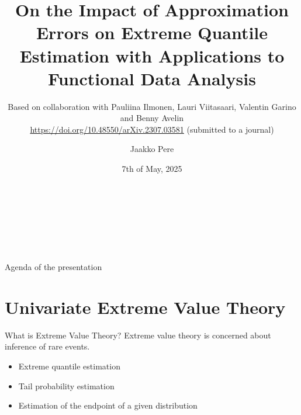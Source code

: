 \documentclass[11pt, aspectratio=169]{beamer}
\author[Jaakko Pere]{Jaakko Pere}
\title{On the Impact of Approximation Errors on Extreme Quantile Estimation with
Applications to Functional Data Analysis}
\subtitle{Based on collaboration with Pauliina Ilmonen, Lauri Viitasaari,
Valentin Garino and Benny Avelin \\
\textcolor{hyscience}{\url{https://doi.org/10.48550/arXiv.2307.03581}}
(submitted to a journal)}
\date{7th of May, 2025}
\institute{Dep.\ of Mathematics and Statistics, University of Helsinki}
\begin{document}
{
  \begin{frame}
    \vspace{2.5cm}
    \begin{center}
      \textcolor{hyblue}{\bf\MakeUppercase{\Large\inserttitle}} \\
      {\footnotesize\insertsubtitle} \\
      {\large\insertauthor} \\
      {\large\insertdate} \\
      {\large\insertinstitute}
    \end{center}
  \end{frame}
}

\begin{frame}{Agenda of the presentation}
  \tableofcontents
\end{frame}

\section{Univariate Extreme Value Theory}


\begin{frame}{What is Extreme Value Theory?}
  Extreme value theory is concerned about inference of rare events.
  \pause
  \vspace{\baselineskip}
  \begin{itemize}
    \item Extreme quantile estimation
    \item Tail probability estimation
    \item Estimation of the endpoint of a given distribution
  \end{itemize}
\end{frame}

\end{document}
